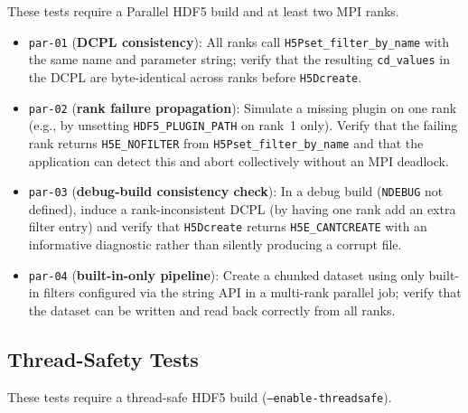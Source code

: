 \documentclass[../HDF5_RFC.tex]{subfiles}
\begin{document}
These tests require a Parallel HDF5 build and at least two MPI ranks.

\begin{itemize}
\item \texttt{par-01} (\textbf{DCPL consistency}): All ranks call
  \texttt{H5Pset\_filter\_by\_name} with the same name and parameter string; verify
  that the resulting \texttt{cd\_values} in the DCPL are byte-identical across ranks
  before \texttt{H5Dcreate}.
\item \texttt{par-02} (\textbf{rank failure propagation}): Simulate a missing plugin
  on one rank (e.g., by unsetting \texttt{HDF5\_PLUGIN\_PATH} on rank~1 only).
  Verify that the failing rank returns \texttt{H5E\_NOFILTER} from
  \texttt{H5Pset\_filter\_by\_name} and that the application can detect this and
  abort collectively without an MPI deadlock.
\item \texttt{par-03} (\textbf{debug-build consistency check}): In a debug build
  (\texttt{NDEBUG} not defined), induce a rank-inconsistent DCPL (by having one rank
  add an extra filter entry) and verify that \texttt{H5Dcreate} returns
  \texttt{H5E\_CANTCREATE} with an informative diagnostic rather than silently
  producing a corrupt file.
\item \texttt{par-04} (\textbf{built-in-only pipeline}): Create a chunked dataset using
  only built-in filters configured via the string API in a multi-rank parallel
  job; verify that the dataset can be written and read back correctly from all
  ranks.
\end{itemize}


\subsection{Thread-Safety Tests}
\label{sec:test-threadsafety}

These tests require a thread-safe HDF5 build (\texttt{--enable-threadsafe}).
\end{document}
